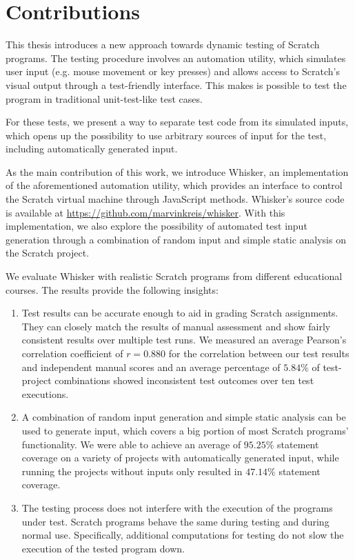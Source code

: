\section{Contributions}

This thesis introduces a new approach towards dynamic testing of Scratch programs.
The testing procedure involves an automation utility, which simulates user input (e.g. mouse movement or key presses)
and allows access to Scratch's visual output through a test-friendly interface.
This makes is possible to test the program in traditional unit-test-like test cases.
\parspace

For these tests, we present a way to separate test code from its simulated inputs,
which opens up the possibility to use arbitrary sources of input for the test,
including automatically generated input.
\parspace

As the main contribution of this work, we introduce Whisker, an implementation of the aforementioned automation utility,
which provides an interface to control the Scratch virtual machine through JavaScript methods.
Whisker's source code is available at \url{https://github.com/marvinkreis/whisker}.
With this implementation, we also explore the possibility of automated test input generation through a combination of random input and simple static analysis on the Scratch project.
\parspace

We evaluate Whisker with realistic Scratch programs from different educational courses.
The results provide the following insights:

\begin{enumerate}[(1)]
    \item Test results can be accurate enough to aid in grading Scratch assignments.
        They can closely match the results of manual assessment and show fairly consistent results over multiple test runs.
        We measured an average Pearson's correlation coefficient of $r = 0.880$ for the correlation
        between our test results and independent manual scores and an average percentage of $5.84\%$ of test-project combinations showed inconsistent test outcomes over ten test executions.
    \item %
        A combination of random input generation and simple static analysis can be used to generate input, which covers a big portion of most Scratch programs' functionality.
        We were able to achieve an average of $95.25\%$ statement coverage on a variety of projects with automatically generated input,
        while running the projects without inputs only resulted in $47.14\%$ statement coverage.
    \item The testing process does not interfere with the execution of the programs under test.
        Scratch programs behave the same during testing and during normal use.
        Specifically, additional computations for testing do not slow the execution of the tested program down.
\end{enumerate}

